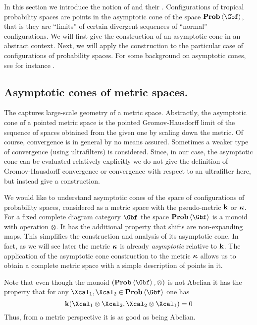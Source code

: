   In this section we introduce the notion of  and
  their . Configurations of tropical
  probability spaces are points in the asymptotic cone of the space
  $\prob\<\Gbf>$, that is they are ``limits'' of certain divergent
  sequences of ``normal'' configurations. We will first give
  the construction of an asymptotic cone in an abstract context. Next,
  we will apply the construction to the particular case of
  configurations of probability spaces. For some background on asymptotic cones, see for instance \cite{Burago-Course-2001}.
     
\subsection{Asymptotic cones of metric spaces.}
\label{s:tropical-ac}
  The  captures large-scale
  geometry of a metric space.  Abstractly, the asymptotic cone of a
  pointed metric space is the pointed Gromov-Hausdorff limit of the
  sequence of spaces obtained from the given one by scaling down the
  metric. Of course, convergence is in general by no means
  assured. Sometimes a weaker type of convergence (using ultrafilters)
  is considered.  Since, in our case, the asymptotic cone can be
  evaluated relatively explicitly we do not give the definition of
  Gromov-Hausdorff convergence or convergence with respect to an
  ultrafilter here, but instead give a construction.
  
  We would like to understand asymptotic cones of the space of
  configurations of probability spaces, considered as a metric space
  with the pseudo-metric $\operatorname{\mathbf{k}}$ or $\operatorname{{\bm\kappa}}$. For a fixed complete
  diagram category $\Gbf$ the space $\prob\<\Gbf>$ is a monoid with
  operation $\otimes$.  It has the additional property that shifts are
  non-expanding maps.  This simplifies the construction and analysis
  of its asymptotic cone.  In fact, as we will see later the metric
  $\operatorname{{\bm\kappa}}$ is already \emph{asymptotic} relative to $\operatorname{\mathbf{k}}$. The
  application of the asymptotic cone construction to the metric
  $\operatorname{{\bm\kappa}}$ allows us to obtain a complete metric space with a simple
  description of points in it.
  
  Note that even though the monoid
  $(\prob\<\Gbf>,\otimes)$ is not Abelian it has the property that for
  any $\Xcal_{1},\Xcal_{2}\in\prob\<\Gbf>$ one
  has \[ \ikd(\Xcal_{1}\otimes\Xcal_{2},\Xcal_{2}\otimes\Xcal_{1})=0 \]
  Thus, from a metric perspective it is as good as being Abelian.

